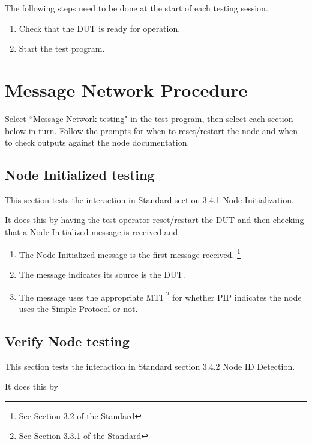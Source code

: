 \documentclass[11pt]{article}
\begin{document}
The following steps need to be done at the start of each testing session.
\begin{enumerate}
\item Check that the DUT is ready for operation.
\item Start the test program.
\end{enumerate}

\section{Message Network Procedure}

Select ``Message Network testing" in the test program, 
then select each section below in turn.  Follow the prompts
for when to reset/restart the node and when to check 
outputs against the node documentation.

\subsection{Node Initialized testing}

This section tests the interaction in Standard section 3.4.1 Node Initialization.

It does this by having the test operator reset/restart the DUT and then
checking that a Node Initialized message is received and
    \begin{enumerate}
    \item The Node Initialized message is the first message received.
            \footnote{See Section 3.2 of the Standard}
    \item The message indicates its source is the DUT.
    \item The message uses the appropriate MTI
            \footnote{See Section 3.3.1 of the Standard}
            for whether PIP indicates the node 
            uses the Simple Protocol or not.
    \end{enumerate}


\subsection{Verify Node testing}

This section tests the interaction in Standard section 3.4.2 Node ID Detection.

It does this by
\end{document}
